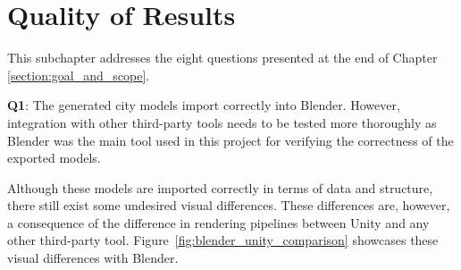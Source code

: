 \section{Quality of Results}

This subchapter addresses the eight questions presented at the end of Chapter \ref{section:goal_and_scope}.

\textbf{Q1}:
The generated city models import correctly into Blender.
However, integration with other third-party tools needs to be tested more thoroughly as Blender was the main tool used in this project for verifying the correctness of the exported models.

Although these models are imported correctly in terms of data and structure, there still exist some undesired visual differences.
These differences are, however, a consequence of the difference in rendering pipelines between Unity and any other third-party tool.
Figure~\ref{fig:blender_unity_comparison} showcases these visual differences with Blender.

